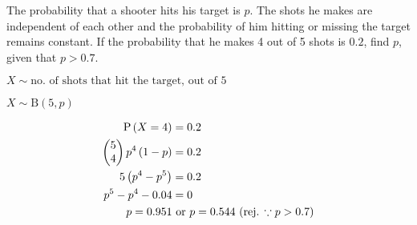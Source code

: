 \documentclass[11pt,a4paper]{book}
\begin{document}
\begin{example}[Finding $p$]

The probability that a shooter hits his target is $p$. The shots
he makes are independent of each other and the probability of him
hitting or missing the target remains constant. If the probability
that he makes 4 out of 5 shots is $0.2$, find $p$, given that $p>0.7$.

\Solution

$X\sim\text{no. of shots that hit the target, out of 5}$

$X\sim\text{B}\left(5,p\right)$

\begin{align*}
\text{P}\left(X=4\right) & =0.2\\
\begin{pmatrix}5\\
4
\end{pmatrix}p^{4}\left(1-p\right) & =0.2\\
5\left(p^{4}-p^{5}\right) & =0.2\\
p^{5}-p^{4}-0.04 & =0\\
p=0.951 & \text{ or }p=0.544\text{ (rej. \ensuremath{\because p>0.7})}
\end{align*}

\end{example}
\end{document}
